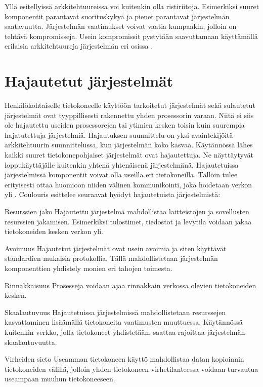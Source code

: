 \documentclass[utf8]{gradu3}
\begin{document}
Yllä esitellyissä arkkitehtuureissa voi kuitenkin olla ristiriitoja. Esimerkiksi suuret komponentit parantavat suorituskykyä  ja pienet parantavat järjestelmän saatavuutta. Järjestelmän vaatimukset voivat vaatia kumpaakin, jolloin on tehtävä kompromisseja. Usein kompromissit pystytään saavuttamaan käyttämällä erilaisia arkkitehtuureja järjestelmän eri osissa \parencite[s.152]{Sommerville}. 

\pagebreak

\section{Hajautetut järjestelmät}
Henkilökohtaiselle tietokoneelle käyttöön tarkoitetut järjestelmät sekä sulautetut järjestelmät ovat tyyppillisesti rakennettu yhden prosessorin varaan. Niitä ei siis ole hajautettu useiden prosessorejen tai ytimien kesken toisin kuin suurempia hajatutettuja järjestelmiä. Hajautuksen suunnittelu on yksi avaintekijöitä arkkitehtuurin suunnittelussa, kun järjestelmän koko kasvaa. Käytännössä lähes kaikki suuret tietokonepohjaiset järjestelmät ovat hajautettuja. Ne näyttäytyvät loppukäyttäjälle kuitenkin yhtenä yhtenäisenä järjestelmänä. Hajautetuissa järjestelmissä komponentit voivat olla useilla eri tietokoneilla. Tällöin tulee erityisesti ottaa huomioon niiden välinen kommunikointi, joka hoidetaan verkon yli \parencite[s. 480]{Sommerville}. Coulouris \parencite{Coulouris} esittelee seuraavat hyödyt hajautetuista järjestelmistä:

\begin{desclist}
\item[Resurssien jako] Hajautettu järjestelmä mahdollistaa laitteistojen ja sovellusten resurssien jakamisen. Esimerkiksi tulostimet, tiedostot ja levytila voidaan jakaa tietokoneiden kesken verkon yli.
\item[Avoimuus] Hajautetut järjestelmät ovat usein avoimia ja siten käyttävät standardien mukaisia protokollia. Tällä mahdollistetaan järjestelmän komponenttien yhdistely monien eri tahojen toimesta.  
\item[Rinnakkaisuus] Prosesseja voidaan ajaa rinnakkain verkossa olevien tietokoneiden kesken.
\item[Skaalautuvuus] Hajautetuissa järjestelmissä mahdollistetaan resurssejen kasvattaminen lisäämällä tietokoneita vaatimusten muuttuessa. Käytännössä kuitenkin verkko, jolla tietokoneet yhdistetään, saattaa rajoittaa järjestelmän skaalautuvuutta.
\item[Virheiden sieto] Useamman tietokoneen käyttö mahdollistaa datan kopioinnin tietokoneiden välillä, jolloin yhden tietokoneen virhetilanteessa voidaan turvautua useampaan muuhun tietokoneeseen. 
\end{desclist}
\end{document}
